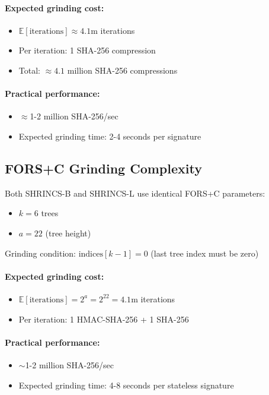 \paragraph{Expected grinding cost:}
\begin{itemize}
    \item $\mathbb{E}[\text{iterations}] \approx 4.1$m iterations
    \item Per iteration: 1 SHA-256 compression
    \item Total: $\approx 4.1$ million SHA-256 compressions
\end{itemize}

\paragraph{Practical performance:}
\begin{itemize}
    \item  $\approx$1-2 million SHA-256/sec
    \item Expected grinding time: 2-4 seconds per signature
\end{itemize}

\subsection{FORS+C Grinding Complexity}
Both SHRINCS-B and SHRINCS-L use identical FORS+C parameters:
\begin{itemize}
    \item $k = 6$ trees
    \item $a = 22$ (tree height)
\end{itemize}

Grinding condition: $\text{indices}[k-1] = 0$ (last tree index must be zero)

\paragraph{Expected grinding cost:}
\begin{itemize}
    \item $\mathbb{E}[\text{iterations}] = 2^a = 2^{22} = 4.1$m iterations
    \item Per iteration: 1 HMAC-SHA-256 + 1 SHA-256 
\end{itemize}

\paragraph{Practical performance:}
\begin{itemize}
    \item $\sim$1-2 million SHA-256/sec
    \item Expected grinding time: 4-8 seconds per stateless signature
\end{itemize}